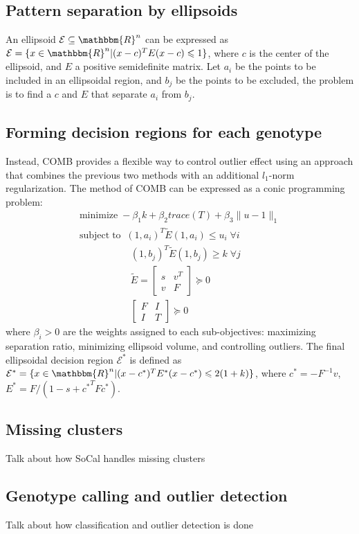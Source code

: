 \documentclass{scrartcl}
\begin{document}
\subsection{Pattern separation by ellipsoids}
An ellipsoid $\mathcal{E} \subseteq \mathbbm{R}^{n}$ can be expressed as
$\mathcal{E} = \{x \in \mathbbm{R}^{n} | (x-c)^TE(x-c)\leqslant1\}$, where
$c$ is the center of the ellipsoid, and $E$ a positive semidefinite matrix.
Let $a_i$ be the points to be included in an ellipsoidal region, and $b_j$
be the points to be excluded, the problem is to find a $c$ and $E$ that
separate $a_i$ from $b_j$.

\subsection{Forming decision regions for each genotype}

Instead, COMB provides a flexible way to control outlier effect using an
approach that combines the previous two methods with an additional $l_1$-norm
regularization.
The method of COMB can be expressed as a conic programming problem:
\begin{gather*}
    \mathrm{minimize}\;-{\beta_{1}}k+{\beta_{2}} trace(T)+\beta_{3} \|u-1\|_1 \\  
    \mathrm{subject\;to}\;\;
    (1,a_i)^T\tilde{E}(1,a_i)\leqslant u_i \; \forall i \\
    \;\;\;\;\;\;\;\;\;\;\;\;\;\;\;\;\;\;\;
    (1,b_j)^T\tilde{E}(1,b_j) \ge k \; \forall j \\
    \;\;\;\;\;\;\;\;\;\;\;\;\;\;\;\;\;\;\;
    \tilde{E}=
    \left[
        \begin{array}{cc}
            s & v^T \\
            v & F
        \end{array}
    \right] \succeq 0 \\
    \;\;\;\;\;\;\;\;\;\;\;\;\;\;\;\;\;\;\;
    \left[
        \begin{array}{cc}
            F & I \\
            I & T
        \end{array}
    \right] \succeq 0
\end{gather*}
where $\beta_{i} > 0$ are the weights assigned to each sub-objectives:
maximizing separation ratio, minimizing ellipsoid volume, and controlling
outliers.
The final ellipsoidal decision region $\mathcal{E}^{*}$ is defined as
$\mathcal{E}^{*}=
\{x \in \mathbbm{R}^{n} | (x-c^{*})^TE^{*}(x-c^{*})\leqslant2(1+k)\}$,
where
$c^{*}=-F^{-1}v$, $E^{*}=F/(1-s+{c^{*}}^TF{c^{*}})$.

\subsection{Missing clusters}
Talk about how SoCal handles missing clusters

\subsection{Genotype calling and outlier detection}
Talk about how classification and outlier detection is done

\end{document}
